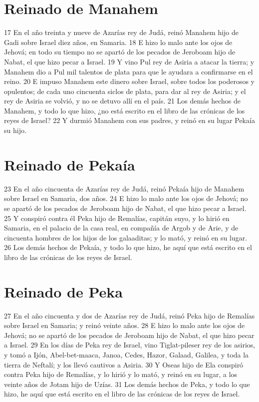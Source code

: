 \section*{Reinado de Manahem}

17 En el año treinta y nueve de Azarías rey de Judá, reinó Manahem hijo de Gadi sobre Israel diez años, en Samaria.
18 E hizo lo malo ante los ojos de Jehová; en todo su tiempo no se apartó de los pecados de Jeroboam hijo de Nabat, el que hizo pecar a Israel.
19 Y vino Pul rey de Asiria a atacar la tierra; y Manahem dio a Pul mil talentos de plata   para que le ayudara a confirmarse en el reino.
20 E impuso Manahem este dinero sobre Israel, sobre todos los poderosos y opulentos; de cada uno cincuenta siclos de plata,   para dar al rey de Asiria; y el rey de Asiria se volvió, y no se detuvo allí en el país.
21 Los demás hechos de Manahem, y todo lo que hizo, ¿no está escrito en el libro de las crónicas de los reyes de Israel?
22 Y durmió Manahem con sus padres, y reinó en su lugar Pekaía su hijo.
\section*{Reinado de Pekaía}

23 En el año cincuenta de Azarías rey de Judá, reinó Pekaía hijo de Manahem sobre Israel en Samaria, dos años.
24 E hizo lo malo ante los ojos de Jehová; no se apartó de los pecados de Jeroboam hijo de Nabat, el que hizo pecar a Israel.
25 Y conspiró contra él Peka hijo de Remalías, capitán suyo, y lo hirió en Samaria, en el palacio de la casa real, en compañía de Argob y de Arie, y de cincuenta hombres de los hijos de los galaaditas; y lo mató, y reinó en su lugar.
26 Los demás hechos de Pekaía, y todo lo que hizo, he aquí que está escrito en el libro de las crónicas de los reyes de Israel.
\section*{Reinado de Peka}

27 En el año cincuenta y dos de Azarías rey de Judá, reinó Peka hijo de Remalías sobre Israel en Samaria; y reinó veinte años.
28 E hizo lo malo ante los ojos de Jehová; no se apartó de los pecados de Jeroboam hijo de Nabat, el que hizo pecar a Israel.
29 En los días de Peka rey de Israel, vino Tiglat-pileser rey de los asirios, y tomó a Ijón, Abel-bet-maaca, Janoa, Cedes, Hazor, Galaad, Galilea, y toda la tierra de Neftalí; y los llevó cautivos a Asiria.
30 Y Oseas hijo de Ela conspiró contra Peka hijo de Remalías, y lo hirió y lo mató, y reinó en su lugar, a los veinte años de Jotam hijo de Uzías.
31 Los demás hechos de Peka, y todo lo que hizo, he aquí que está escrito en el libro de las crónicas de los reyes de Israel.
